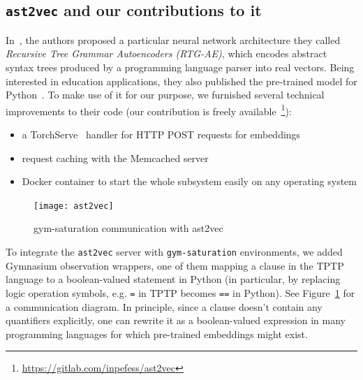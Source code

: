 \documentclass[runningheads]{llncs}
\begin{document}
\subsection{\texttt{ast2vec} and our contributions to it}
In~\cite{Paassen2022}, the authors proposed a particular neural network architecture they called \emph{Recursive Tree Grammar Autoencoders (RTG-AE)}, which encodes abstract syntax trees produced by a programming language parser into real vectors. Being interested in education applications, they also published the pre-trained model for Python~\cite{Paassen_McBroom_Jeffries_Koprinska_Yacef_2021}. To make use of it for our purpose, we furnished several technical improvements to their code (our contribution is freely available~\footnote{\url{https://gitlab.com/inpefess/ast2vec}}):
\begin{itemize}
\item a TorchServe~\cite{torchserve} handler for HTTP POST requests for embeddings
\item request caching with the Memcached server~\cite{memcached}
\item Docker container to start the whole subsystem easily on any operating system
\end{itemize}

\begin{figure}[H]
\texttt{[image: ast2vec]}
\caption{gym-saturation communication with ast2vec} \label{fig:ast2vec}
\end{figure}

To integrate the \texttt{ast2vec} server with \texttt{gym-saturation} environments, we added Gymnasium observation wrappers, one of them mapping a clause in the TPTP language to a boolean-valued statement in Python (in particular, by replacing logic operation symbols, e.g. \texttt{=} in TPTP becomes \texttt{==} in Python). See Figure~\ref{fig:ast2vec} for a communication diagram. In principle, since a clause doesn't contain any quantifiers explicitly, one can rewrite it as a boolean-valued expression in many programming languages for which pre-trained embeddings might exist.
\end{document}
